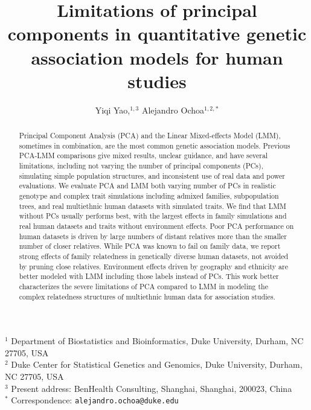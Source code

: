 \documentclass[11pt]{article}
\title{\Large \textbf{
    Limitations of principal components in quantitative genetic association models for human studies
  }}
\author{Yiqi Yao,$^{1,3}$ Alejandro Ochoa$^{1,2,*}$}
\date{}
\begin{document}
\begin{linenumbers}

\maketitle

\noindent
$^1$ Department of Biostatistics and Bioinformatics, Duke University, Durham, NC 27705, USA \\
$^2$ Duke Center for Statistical Genetics and Genomics, Duke University, Durham, NC 27705, USA \\
$^3$ Present address: BenHealth Consulting, Shanghai, Shanghai, 200023, China \\
$^*$ Correspondence: \texttt{alejandro.ochoa@duke.edu}

\begin{abstract}
  Principal Component Analysis (PCA) and the Linear Mixed-effects Model (LMM), sometimes in combination, are the most common genetic association models.
  Previous PCA-LMM comparisons give mixed results, unclear guidance, and have several limitations, including not varying the number of principal components (PCs), simulating simple population structures, and inconsistent use of real data and power evaluations.
  We evaluate PCA and LMM both varying number of PCs in realistic genotype and complex trait simulations including admixed families, subpopulation trees, and real multiethnic human datasets with simulated traits.
  We find that LMM without PCs usually performs best, with the largest effects in family simulations and real human datasets and traits without environment effects.
  Poor PCA performance on human datasets is driven by large numbers of distant relatives more than the smaller number of closer relatives.
  While PCA was known to fail on family data, we report strong effects of family relatedness in genetically diverse human datasets, not avoided by pruning close relatives.
  Environment effects driven by geography and ethnicity are better modeled with LMM including those labels instead of PCs.
  This work better characterizes the severe limitations of PCA compared to LMM in modeling the complex relatedness structures of multiethnic human data for association studies.
\end{abstract}



\end{linenumbers}
\end{document}
